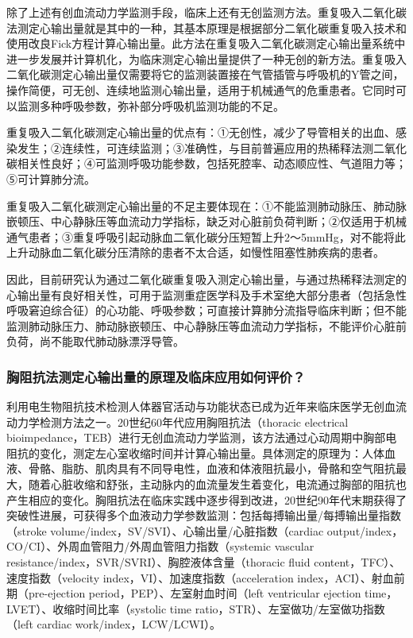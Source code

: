 除了上述有创血流动力学监测手段，临床上还有无创监测方法。重复吸入二氧化碳法测定心输出量就是其中的一种，其基本原理是根据部分二氧化碳重复吸入技术和使用改良Fick方程计算心输出量。此方法在重复吸入二氧化碳测定心输出量系统中进一步发展并计算机化，为临床测定心输出量提供了一种无创的新方法。重复吸入二氧化碳测定心输出量仅需要将它的监测装置接在气管插管与呼吸机的Y管之间，操作简便，可无创、连续地监测心输出量，适用于机械通气的危重患者。它同时可以监测多种呼吸参数，弥补部分呼吸机监测功能的不足。

重复吸入二氧化碳测定心输出量的优点有：①无创性，减少了导管相关的出血、感染发生；②连续性，可连续监测；③准确性，与目前普遍应用的热稀释法测二氧化碳相关性良好；④可监测呼吸功能参数，包括死腔率、动态顺应性、气道阻力等；⑤可计算肺分流。

重复吸入二氧化碳测定心输出量的不足主要体现在：①不能监测肺动脉压、肺动脉嵌顿压、中心静脉压等血流动力学指标，缺乏对心脏前负荷判断；②仅适用于机械通气患者；③重复呼吸引起动脉血二氧化碳分压短暂上升2～5mmHg，对不能将此上升动脉血二氧化碳分压清除的患者不太合适，如慢性阻塞性肺疾病的患者。

因此，目前研究认为通过二氧化碳重复吸入测定心输出量，与通过热稀释法测定的心输出量有良好相关性，可用于监测重症医学科及手术室绝大部分患者（包括急性呼吸窘迫综合征）的心功能、呼吸参数；可直接计算肺分流指导临床判断；但不能监测肺动脉压力、肺动脉嵌顿压、中心静脉压等血流动力学指标，不能评价心脏前负荷，尚不能取代肺动脉漂浮导管。

\subsubsection{胸阻抗法测定心输出量的原理及临床应用如何评价？}

利用电生物阻抗技术检测人体器官活动与功能状态已成为近年来临床医学无创血流动力学检测方法之一。20世纪60年代应用胸阻抗法（thoracic
electrical
bioimpedance，TEB）进行无创血流动力学监测，该方法通过心动周期中胸部电阻抗的变化，测定左心室收缩时间并计算心输出量。具体测定的原理为：人体血液、骨骼、脂肪、肌肉具有不同导电性，血液和体液阻抗最小，骨骼和空气阻抗最大，随着心脏收缩和舒张，主动脉内的血流量发生着变化，电流通过胸部的阻抗也产生相应的变化。胸阻抗法在临床实践中逐步得到改进，20世纪90年代末期获得了突破性进展，可获得多个血液动力学参数监测：包括每搏输出量/每搏输出量指数（stroke
volume/index，SV/SVI）、心输出量/心脏指数（cardiac
output/index，CO/CI）、外周血管阻力/外周血管阻力指数（systemic vascular
resistance/index，SVR/SVRI）、胸腔液体含量（thoracic fluid
content，TFC）、速度指数（velocity index，VI）、加速度指数（acceleration
index，ACI）、射血前期（pre-ejection period，PEP）、左室射血时间（left
ventricular ejection time，LVET）、收缩时间比率（systolic time
ratio，STR）、左室做功/左室做功指数（left cardiac
work/index，LCW/LCWI）。

